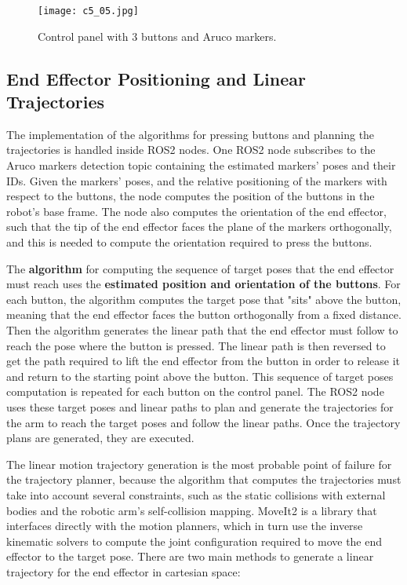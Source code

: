 \begin{figure}[t]
    \centering
    \texttt{[image: c5\_05.jpg]}
    \caption{Control panel with 3 buttons and Aruco markers.}
    \label{fig:buttonsbox}
\end{figure}

\subsection{End Effector Positioning and Linear Trajectories}


The implementation of the algorithms for pressing buttons and planning the trajectories is handled inside
ROS2 nodes. One ROS2 node subscribes to the Aruco markers detection topic containing the estimated markers' poses 
and their IDs. Given the markers' poses, and the relative positioning of the markers with respect to the buttons,
the node computes the position of the buttons in the robot's base frame. The node also computes the orientation
of the end effector, such that the tip of the end effector faces the plane of the markers orthogonally, and this
is needed to compute the orientation required to press the buttons.

The \textbf{algorithm} for computing the sequence of target poses that the end effector must reach uses the 
\textbf{estimated position and orientation of the buttons}. For each button, the algorithm computes the target pose that 
"sits" above the button, meaning that the end effector faces the button orthogonally from a fixed distance.
Then the algorithm generates the linear path that the end effector must follow to reach the pose where 
the button is pressed. The linear path is then reversed to get the path required to lift the end effector 
from the button in order to release it and return to the starting point above the button. This sequence
of target poses computation is repeated for each button on the control panel. The ROS2 node uses these target 
poses and linear paths to plan and generate the trajectories for the arm to reach the target poses and 
follow the linear paths. Once the trajectory plans are generated, they are executed.

The linear motion trajectory generation is the most probable point of failure for the trajectory planner,
because the algorithm that computes the trajectories must take into account several constraints,
such as the static collisions with external bodies and the robotic arm's self-collision mapping.
MoveIt2 is a library that interfaces directly with the motion planners, which in turn use the inverse
kinematic solvers to compute the joint configuration required to move the end effector to the target pose.
There are two main methods to generate a linear trajectory for the end effector in cartesian space:

